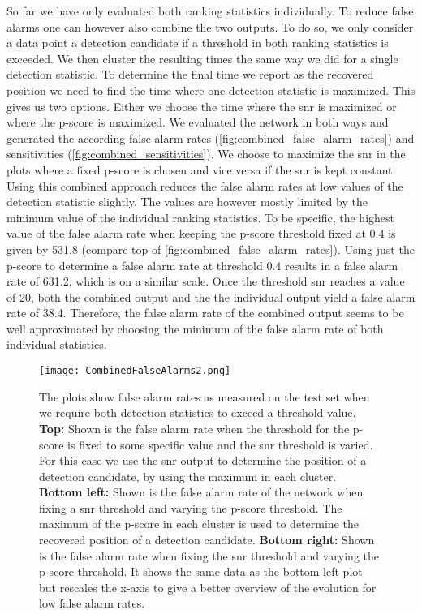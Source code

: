 So far we have only evaluated both ranking statistics individually. To reduce false alarms one can however also combine the two outputs. To do so, we only consider a data point a detection candidate if a threshold in both ranking statistics is exceeded. We then cluster the resulting times the same way we did for a single detection statistic. To determine the final time we report as the recovered position we need to find the time where one detection statistic is maximized. This gives us two options. Either we choose the time where the \gls{snr} is maximized or where the p-score is maximized. We evaluated the network in both ways and generated the according false alarm rates (\autoref{fig:combined_false_alarm_rates}) and sensitivities (\autoref{fig:combined_sensitivities}). We choose to maximize the \gls{snr} in the plots where a fixed p-score is chosen and vice versa if the \gls{snr} is kept constant.\\
Using this combined approach reduces the false alarm rates at low values of the detection statistic slightly. The values are however mostly limited by the minimum value of the individual ranking statistics. To be specific, the highest value of the false alarm rate when keeping the p-score threshold fixed at $0.4$ is given by 531.8 (compare top of \autoref{fig:combined_false_alarm_rates}). Using just the p-score to determine a false alarm rate at threshold $0.4$ results in a false alarm rate of 631.2, which is on a similar scale. Once the threshold \gls{snr} reaches a value of 20, both the combined output and the the individual output yield a false alarm rate of 38.4. Therefore, the false alarm rate of the combined output seems to be well approximated by choosing the minimum of the false alarm rate of both individual statistics.\\
\begin{figure}
\centering
\texttt{[image: CombinedFalseAlarms2.png]}
\caption[False alarm rates of combined outputs]{The plots show false alarm rates as measured on the test set when we require both detection statistics to exceed a threshold value. \textbf{Top:} Shown is the false alarm rate when the threshold for the p-score is fixed to some specific value and the \gls{snr} threshold is varied. For this case we use the \gls{snr} output to determine the position of a detection candidate, by using the maximum in each cluster. \textbf{Bottom left:} Shown is the false alarm rate of the network when fixing a \gls{snr} threshold and varying the p-score threshold. The maximum of the p-score in each cluster is used to determine the recovered position of a detection candidate. \textbf{Bottom right:} Shown is the false alarm rate when fixing the \gls{snr} threshold and varying the p-score threshold. It shows the same data as the bottom left plot but rescales the x-axis to give a better overview of the evolution for low false alarm rates.}\label{fig:combined_false_alarm_rates}
\end{figure}
